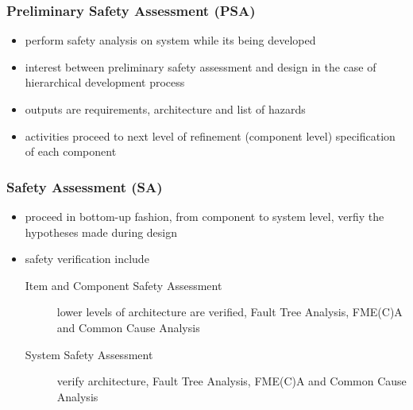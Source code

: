 \documentclass[a4paper, 10pt]{article}
\begin{document}
\subsubsection*{Preliminary Safety Assessment (PSA)}
\begin{itemize}
    \item perform safety analysis on system while its being developed
    \item interest  between preliminary safety assessment and design in the case of hierarchical development process
    \item outputs are requirements, architecture and list of hazards
    \item activities proceed to next level of refinement (component level) \follows specification of each component
\end{itemize}

\subsubsection*{Safety Assessment (SA)}
\begin{itemize}
    \item proceed in bottom-up fashion, from component to system level, verfiy the hypotheses made during design
    \item safety verification include
    \begin{description}
        \item[Item and Component Safety Assessment] lower levels of architecture are verified, Fault Tree Analysis, FME(C)A and Common Cause Analysis
        \item[System Safety Assessment] verify architecture, Fault Tree Analysis, FME(C)A and Common Cause Analysis
    \end{description}
\end{itemize}
\end{document}
